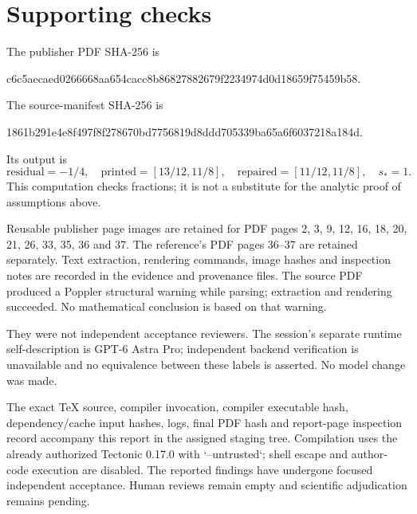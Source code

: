 \documentclass[10pt]{article}
\begin{document}
\section*{Supporting checks}
The publisher PDF SHA-256 is\par
c6c5aecaed0266668aa654cacc8b86827882679f2234974d0d18659f75459b58.\par
The source-manifest SHA-256 is\par
1861b291e4e8f497f8f278670bd7756819d8ddd705339ba65a6f6037218a184d.\par
Its output is \[\mathrm{residual}=-1/4,\quad
 \mathrm{printed}=[13/12,11/8],\quad
 \mathrm{repaired}=[11/12,11/8],\quad
 s_*=1.\] This computation checks fractions; it is not a substitute for the analytic proof of assumptions above.\par
Reusable publisher page images are retained for PDF pages 2, 3, 9, 12, 16, 18, 20, 21, 26, 33, 35, 36 and 37. The reference’s PDF pages 36–37 are retained separately. Text extraction, rendering commands, image hashes and inspection notes are recorded in the evidence and provenance files. The source PDF produced a Poppler structural warning while parsing; extraction and rendering succeeded. No mathematical conclusion is based on that warning.\par
They were not independent acceptance reviewers. The session’s separate runtime self-description is GPT-6 Astra Pro; independent backend verification is unavailable and no equivalence between these labels is asserted. No model change was made.\par
The exact TeX source, compiler invocation, compiler executable hash, dependency/cache input hashes, logs, final PDF hash and report-page inspection record accompany this report in the assigned staging tree. Compilation uses the already authorized Tectonic 0.17.0 with `–untrusted`; shell escape and author-code execution are disabled. The reported findings have undergone focused independent acceptance. Human reviews remain empty and scientific adjudication remains pending.\par
\end{document}
